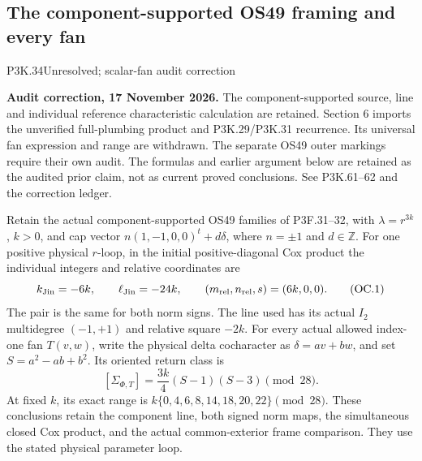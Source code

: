 \subsection{The component-supported OS49 framing and every fan}
\begin{statement}{P3K.34}{Unresolved; scalar-fan audit correction}
\par\noindent\textbf{Audit correction, 17 November 2026.} The component-supported source, line and individual reference characteristic calculation are retained. Section 6 imports the unverified full-plumbing product and P3K.29/P3K.31 recurrence. Its universal fan expression and range are withdrawn. The separate OS49 outer markings require their own audit. The formulas and earlier argument below are retained as the audited prior claim, not as current proved conclusions. See P3K.61--62 and the correction ledger.
\medskip


Retain the actual component-supported OS49 families of P3F.31--32,
with \(\lambda=r^{3k}\), \(k>0\), and cap vector
\(n(1,-1,0,0)^t+d\delta\), where \(n=\pm1\) and \(d\in\mathbb Z\).
For one positive physical \(r\)-loop, in the initial positive-diagonal
Cox product the individual integers and relative coordinates are
\[
 k_{\rm Jin}=-6k,\qquad \ell_{\rm Jin}=-24k,\qquad
 (m_{\rm rel},n_{\rm rel},s)=(6k,0,0).
 \tag{OC.1}
\]
The pair is the same for both norm signs. The line used has its actual
\(I_2\) multidegree \((-1,+1)\) and relative square \(-2k\).
For every actual allowed index-one fan \(T(v,w)\), write the physical
delta cocharacter as \(\delta=a v+b w\), and set \(S=a^2-ab+b^2\).
Its oriented return class is
\[
 [\Sigma_{\Phi,T}]=\frac{3k}{4}(S-1)(S-3)\pmod{28}.
 \tag{OC.2}
\]
At fixed \(k\), its exact range is
\(k\{0,4,6,8,14,18,20,22\}\pmod{28}\).
These conclusions retain the component line, both signed norm maps,
the simultaneous closed Cox product, and the actual common-exterior
frame comparison. They use the stated physical parameter loop.

\end{statement}
